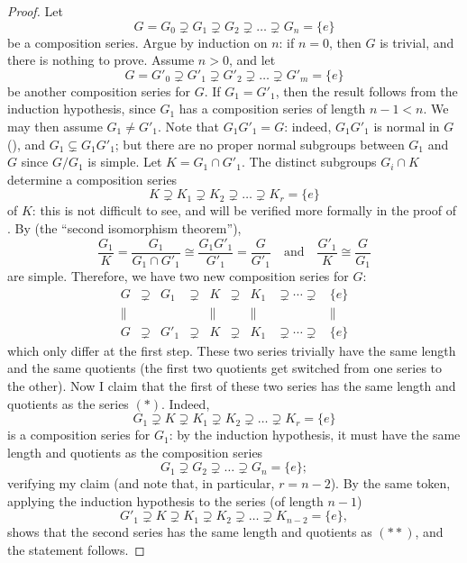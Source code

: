 \begin{proof}
  Let
  \[
    \tag{*} G = G_0 \supsetneq G_1 \supsetneq G_2 \supsetneq \dots
    \supsetneq G_n = \{e\}
  \]
  be a composition series. Argue by induction on $n$: if $n = 0$, then
  $G$ is trivial, and there is nothing to prove. Assume $n > 0$, and
  let
  \[
    \tag{**} G = G'_0 \supsetneq G'_1 \supsetneq G'_2 \supsetneq \dots
    \supsetneq G'_m = \{e\}
  \]
  be another composition series for $G$. If $G_1 = G'_1$, then the
  result follows from the induction hypothesis, since $G_1$ has a
  composition series of length $n - 1 < n$.  We may then assume
  $G_1 \neq G'_1$. Note that $G_1 G'_1 = G$: indeed, $G_1 G'_1$ is
  normal in $G$
  (), and
  $G_1 \subsetneq G_1 G'_1$; but there are no proper normal subgroups
  between $G_1$ and $G$ since $G/G_1$ is simple.  Let
  $K = G_1 \cap G'_1$. The distinct subgroups $G_i \cap K$ determine a
  composition series
  \[
    K \supsetneq K_1 \supsetneq K_2 \supsetneq \dots \supsetneq K_r =
    \{e\}
  \]
  of $K$: this is not difficult to see, and will be verified more
  formally in the proof of . By
   (the ``second
  isomorphism theorem''),
  \[
    \frac{G_1}{K} = \frac{G_1}{G_1 \cap G'_1} \cong \frac{G_1
      G'_1}{G'_1} = \frac{G}{G'_1} \quad\text{and}\quad \frac{G'_1}{K}
    \cong \frac{G}{G_1}
  \]
  are simple. Therefore, we have two new composition series for $G$:
  \[
    \begin{array}{ccccccccc}
      G & \supsetneq & G_1 & \supsetneq & K & \supsetneq & K_1
      & \supsetneq \cdots \supsetneq & \{e\}\\
      \| & & & & \| & & \| & & \|\\
      G & \supsetneq & G'_1 & \supsetneq & K & \supsetneq & K_1
      & \supsetneq \cdots \supsetneq & \{e\}
    \end{array}
  \]
  which only differ at the first step. These two series trivially have
  the same length and the same quotients (the first two quotients get
  switched from one series to the other).  Now I claim that the first
  of these two series has the same length and quotients as the series
  $(*)$. Indeed,
  \[
    G_1 \supsetneq K \supsetneq K_1 \supsetneq K_2 \supsetneq \dots
    \supsetneq K_r = \{e\}
  \]
  is a composition series for $G_1$: by the induction hypothesis, it
  must have the same length and quotients as the composition series
  \[
    G_1 \supsetneq G_2 \supsetneq \dots \supsetneq G_n = \{e\};
  \]
  verifying my claim (and note that, in particular, $r = n - 2$).  By
  the same token, applying the induction hypothesis to the series (of
  length $n - 1$)
  \[
    G'_1 \supsetneq K \supsetneq K_1 \supsetneq K_2 \supsetneq \dots
    \supsetneq K_{n-2} = \{e\},
  \]
  shows that the second series has the same length and quotients as
  $(**)$, and the statement follows.
\end{proof}

